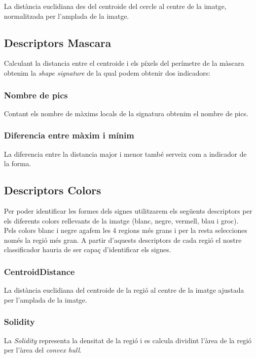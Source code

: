 La distància euclidiana des del centroide del cercle al centre de la imatge,
normalitzada per l'amplada de la imatge.

\subsection{Descriptors Mascara}

Calculant la distancia entre el centroide i els píxels del perímetre de la màscara
obtenim la
\emph{shape signature} de la qual podem obtenir dos indicadors:

\subsubsection{Nombre de pics}
Contant els nombre de màxims locals de la signatura obtenim el nombre de pics.

\subsubsection{Diferencia entre màxim i mínim}
La diferencia entre la distancia major i menor també serveix com a indicador de la forma.

\subsection{Descriptors Colors}%
\label{sub:desc_col}

Per poder identificar les formes dels signes utilitzarem els següents descriptors per els diferents
colors rellevants de la imatge (blanc, negre, vermell, blau i groc). Pels colors blanc i
negre agafem les 4 regions més grans i per la resta selecciones només la regió més
gran. A partir d'aquests descriptors
de cada regió el nostre classificador hauria de ser capaç d'identificar els signes.

\subsubsection{CentroidDistance}

La distància euclidiana del centroide de la regió al centre de la imatge ajustada
per l'amplada de la imatge.

\subsubsection{Solidity}

La \emph{Solidity} representa la densitat de la regió i es calcula dividint l'àrea
de la regió per l'àrea del \emph{convex hull}.

